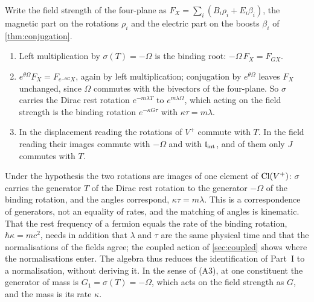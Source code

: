 \begin{theorem}
\label{thm:massgen}
Write the field strength of the four-plane as $F_X=\sum_i(B_i\rho_i+E_i\beta_i)$, the magnetic part on the rotations $\rho_i$ and the
electric part on the boosts $\beta_i$ of \cref{thm:conjugation}.
\begin{enumerate}[label=(\roman*),leftmargin=2.2em,itemsep=1pt]
\item Left multiplication by $\sigma(T)=-\Omega$ is the binding root: $-\Omega\,F_X=F_{GX}$.
\item $e^{\theta\Omega}F_X=F_{e^{-\theta G}X}$, again by left multiplication; conjugation by $e^{\theta\Omega}$ leaves $F_X$ unchanged, since
$\Omega$ commutes with the bivectors of the four-plane. So $\sigma$ carries the Dirac rest rotation $e^{-m\lambda T}$ to $e^{m\lambda\Omega}$,
which acting on the field strength is the binding rotation $e^{-\kappa G\tau}$ with $\kappa\tau=m\lambda$.
\item In the displacement reading the rotations of $V^+$ commute with $T$. In the field reading their images commute with $-\Omega$ and with
$\mathfrak l_{\rm int}$, and of them only $J$ commutes with $T$.
\end{enumerate}
\end{theorem}

Under the hypothesis the two rotations are images of one element of $\mathrm{Cl}(V^+)$: $\sigma$ carries the generator $T$ of the Dirac rest rotation
to the generator $-\Omega$ of the binding rotation, and the angles correspond, $\kappa\tau=m\lambda$. This is a correspondence of generators,
not an equality of rates, and the matching of angles is kinematic. That the rest frequency of a fermion equals the rate of the binding
rotation, $\hbar\kappa=mc^2$, needs in addition that $\lambda$ and $\tau$ are the same physical time and that the normalisations of the
fields agree; the coupled action of \cref{sec:coupled} shows where the normalisations enter. The algebra thus reduces the identification of
Part~I to a normalisation, without deriving it. In the sense of (A3), at one constituent the generator of mass is $G_1=\sigma(T)=-\Omega$,
which acts on the field strength as $G$, and the mass is its rate $\kappa$.

